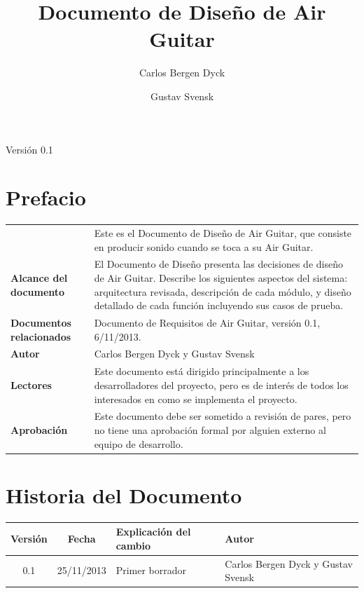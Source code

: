 \documentclass[a4paper,10pt]{article}
\title{Documento de Diseño de Air Guitar}
\author{Carlos Bergen Dyck \and Gustav Svensk}
\begin{document}
\renewcommand{\arraystretch}{1.5}
\maketitle
\begin{center}
        {\large Versión 0.1}
\end{center}
\newpage


\section{Prefacio}
\begin{tabular}{p{3cm} p{12cm}}
        & Este es el Documento de Diseño de Air Guitar, que consiste en
        producir sonido cuando se toca a su Air Guitar. \\
        \textbf{Alcance del documento} & El Documento de Diseño presenta las
        decisiones de diseño de Air Guitar. Describe los siguientes aspectos del
        sistema: arquitectura revisada, descripción de cada módulo, y diseño
        detallado de cada función incluyendo sus casos de prueba.\\
        \textbf{Documentos relacionados} & Documento de Requisitos de Air Guitar,
        versión 0.1, 6/11/2013. \\
        \textbf{Autor} & Carlos Bergen Dyck y Gustav Svensk \\
        \textbf{Lectores} & Este documento está dirigido principalmente a los
        desarrolladores del proyecto, pero es de interés de todos los
        interesados en como se implementa el proyecto. \\
        \textbf{Aprobación} & Este documento debe ser sometido a revisión de
        pares, pero no tiene una aprobación formal por alguien externo al equipo
        de desarrollo.
\end{tabular}

\section{Historia del Documento}
\begin{tabular}{|c|c|p{6cm}|p{4cm}|}
        \hline
        \textbf{Versión} & \textbf{Fecha} & \textbf{Explicación del cambio} &
        \textbf{Autor} \\ \hline
        0.1 & 25/11/2013 & Primer borrador & Carlos Bergen Dyck y Gustav Svensk \\
        \hline
\end{tabular}
\end{document}

